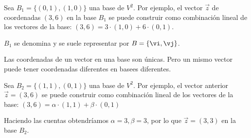 \begin{example}
		Sea $B_1=\{(0,1),(1,0)\}$ una base de $ V^2$. Por ejemplo, el vector $\vec{z}$ de coordenadas $(3,6)$ en la base $B_1$ se puede construir como combinación lineal de los vectores de la base: $(3,6) = 3·(1,0) + 6·(0,1)$.

		\obs $B_1$ se denomina  y se suele representar por $B=\{\vi,\vj\}$.
\end{example}


\obs Las coordenadas de un vector en una base son únicas. Pero un mismo vector puede tener coordenadas diferentes en basees diferentes.

\begin{example}
	Sea $B_2=\{(1,1),(0,1)\}$ una base de $ V^2$. Por ejemplo, el vector anterior $\vec{z}=(3,6)$ se puede construir como combinación lineal de los vectores de la base: $(3,6) = \alpha·(1,1) + \beta·(0,1)$


	Haciendo las cuentas obtendríamos $\alpha=3, \beta=3$, por lo que $\vec{z}=(3,3)$ en la base $B_2$.
\end{example}

